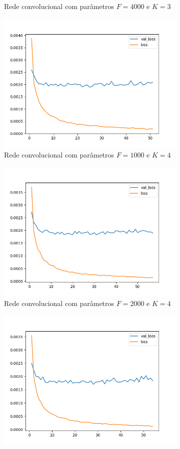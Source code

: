 \begin{figure}[H]
\begin{subfigure}{.5\textwidth}
  \caption{Rede convolucional com parâmetros $F = 4000$ e $K = 3$}
  \label{fig:cnn-4000-k-3}
\end{subfigure}
\begin{subfigure}{.5\textwidth}
  \centering
  \includegraphics[width=.8\linewidth]{figuras/ape-ajustes-hiper-parametros/cnn-1000-k-4.png}
  \caption{Rede convolucional com parâmetros $F = 1000$ e $K = 4$}
  \label{fig:cnn-1000-k-4}
\end{subfigure}
\begin{subfigure}{.5\textwidth}
  \centering
  \includegraphics[width=.8\linewidth]{figuras/ape-ajustes-hiper-parametros/cnn-2000-k-4.png}
  \caption{Rede convolucional com parâmetros $F = 2000$ e $K = 4$}
  \label{fig:cnn-2000-k-4}
\end{subfigure}
\begin{subfigure}{.5\textwidth}
  \centering
  \includegraphics[width=.8\linewidth]{figuras/ape-ajustes-hiper-parametros/cnn-4000-k-4.png}

\end{subfigure}
\end{figure}
